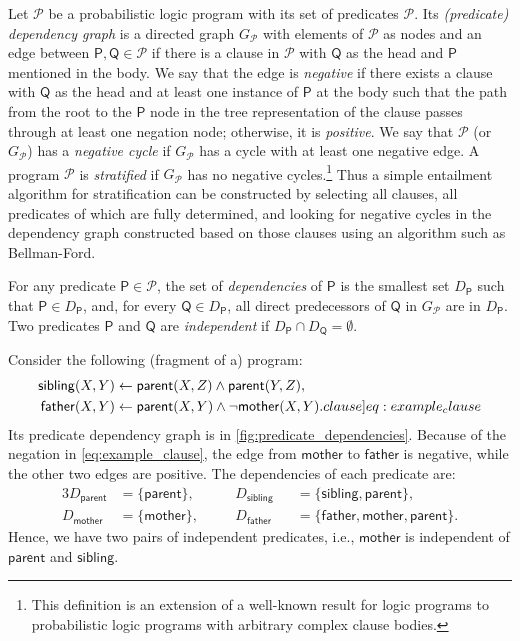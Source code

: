 \documentclass[runningheads]{llncs}
\newcommand{\predicates}{\mathcal{P}}
\begin{document}
Let $\mathscr{P}$ be a probabilistic logic program with its set of predicates
$\predicates{}$. Its \emph{(predicate) dependency graph} is a directed graph
$G_{\mathscr{P}}$ with elements of $\predicates{}$ as nodes and an edge between
$\mathsf{P}, \mathsf{Q} \in \predicates{}$ if there is a clause in $\mathscr{P}$
with $\mathsf{Q}$ as the head and $\mathsf{P}$ mentioned in the body. We say
that the edge is \emph{negative} if there exists a clause with $\mathsf{Q}$ as
the head and at least one instance of $\mathsf{P}$ at the body such that the
path from the root to the $\mathsf{P}$ node in the tree representation of the
clause passes through at least one negation node; otherwise, it is
\emph{positive}. We say that $\mathscr{P}$ (or $G_{\mathscr{P}}$) has a
\emph{negative cycle} if $G_{\mathscr{P}}$ has a cycle with at least one
negative edge. A program $\mathscr{P}$ is \emph{stratified} if $G_{\mathscr{P}}$
has no negative cycles.\footnote{This definition is an extension of a well-known
  result for logic programs \cite{DBLP:journals/jlp/BalbinPRM91} to
  probabilistic logic programs with arbitrary complex clause bodies.} Thus a
simple entailment algorithm for stratification can be constructed by selecting
all clauses, all predicates of which are fully determined, and looking for
negative cycles in the dependency graph constructed based on those clauses using
an algorithm such as Bellman-Ford.

For any predicate $\mathsf{P} \in \predicates{}$, the set of \emph{dependencies}
of $\mathsf{P}$ is the smallest set $D_{\mathsf{P}}$ such that $\mathsf{P} \in
D_{\mathsf{P}}$, and, for every $\mathsf{Q} \in D_{\mathsf{P}}$, all direct
predecessors of $\mathsf{Q}$ in $G_{\mathscr{P}}$ are in $D_{\mathsf{P}}$. Two
predicates $\mathsf{P}$ and $\mathsf{Q}$ are \emph{independent} if
$D_{\mathsf{P}} \cap D_{\mathsf{Q}} = \emptyset$.

\begin{example} \label{ex:program}
  Consider the following (fragment of a) program:
  \begin{align}
    \mathsf{sibling}(X, Y) &\gets \mathsf{parent}(X, Z) \land \mathsf{parent}(Y, Z), \nonumber \\
    \mathsf{father}(X, Y) &\gets \mathsf{parent}(X, Y) \land \neg\mathsf{mother}(X, Y). \label[clause]{eq:example_clause}
  \end{align}
  Its predicate dependency graph is in \cref{fig:predicate_dependencies}.
  Because of the negation in \eqref{eq:example_clause}, the edge from
  $\mathsf{mother}$ to $\mathsf{father}$ is negative, while the other two edges
  are positive. The dependencies of each predicate are:
  \begin{alignat*}{3}
    D_{\mathsf{parent}} &= \{ \mathsf{parent} \}, \quad && D_{\mathsf{sibling}}
    &&= \{\mathsf{sibling}, \mathsf{parent} \},\\
    D_{\mathsf{mother}} &= \{ \mathsf{mother} \}, \quad && D_{\mathsf{father}}
    &&= \{ \mathsf{father}, \mathsf{mother}, \mathsf{parent} \}.
  \end{alignat*}
  Hence, we have two pairs of independent predicates, i.e., $\mathsf{mother}$ is
  independent of $\mathsf{parent}$ and $\mathsf{sibling}$.
\end{example}
\end{document}

